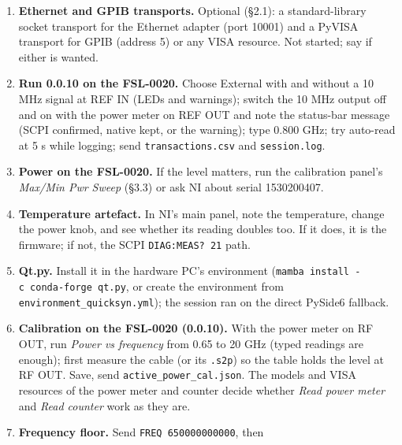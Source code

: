 \documentclass[
\directlua{luaotfload.add_fallback("qsfallback", {"DejaVu Sans:mode=harf;", "DejaVu Sans Mono:mode=harf;", "DejaVu Math TeX Gyre:mode=harf;"})}
  10pt,
  letterpaper,
]{article}
\begin{document}
\begin{enumerate}
  the reply to the native \texttt{01} (Send line); set +13, 0, −10 dBm
  with \emph{Command} = \emph{SCPI only}, then again with \emph{Native
  only}, reading \texttt{POW?} and \emph{Read (0D)} each time and the
  measured level. Then press RF OUTPUT OFF and measure. Send the
  \texttt{transactions.csv} of that session. This settles whether option
  2 is fitted, whether the firmware accepts \texttt{POW\ +12.0} (sign)
  and \texttt{POW\ +0.0}, which command form works, whether
  \texttt{POW?} reflects the output or only the setting, and the
  \texttt{0D} reply format.
\item
  \textbf{Ethernet and GPIB transports.} Optional (§2.1): a
  standard-library socket transport for the Ethernet adapter (port
  10001) and a PyVISA transport for GPIB (address 5) or any VISA
  resource. Not started; say if either is wanted.
\item
  \textbf{Run 0.0.10 on the FSL-0020.} Choose External with and without
  a 10 MHz signal at REF IN (LEDs and warnings); switch the 10 MHz
  output off and on with the power meter on REF OUT and note the
  status-bar message (SCPI confirmed, native kept, or the warning); type
  0.800 GHz; try auto-read at 5 s while logging; send
  \texttt{transactions.csv} and \texttt{session.log}.
\item
  \textbf{Power on the FSL-0020.} If the level matters, run the
  calibration panel's \emph{Max/Min Pwr Sweep} (§3.3) or ask NI about
  serial 1530200407.
\item
  \textbf{Temperature artefact.} In NI's main panel, note the
  temperature, change the power knob, and see whether its reading
  doubles too. If it does, it is the firmware; if not, the SCPI
  \texttt{DIAG:MEAS?\ 21} path.
\item
  \textbf{Qt.py.} Install it in the hardware PC's environment
  (\texttt{mamba\ install\ -c\ conda-forge\ qt.py}, or create the
  environment from \texttt{environment\_quicksyn.yml}); the session ran
  on the direct PySide6 fallback.
\item
  \textbf{Calibration on the FSL-0020 (0.0.10).} With the power meter on
  RF OUT, run \emph{Power vs frequency} from 0.65 to 20 GHz (typed
  readings are enough); first measure the cable (or its \texttt{.s2p})
  so the table holds the level at RF OUT. Save, send
  \texttt{active\_power\_cal.json}. The models and VISA resources of the
  power meter and counter decide whether \emph{Read power meter} and
  \emph{Read counter} work as they are.
\item
  \textbf{Frequency floor.} Send \texttt{FREQ\ 650000000000}, then

\end{enumerate}
\end{document}
